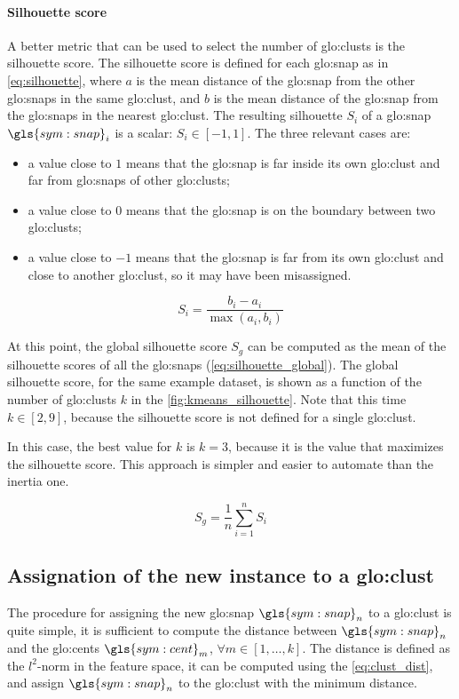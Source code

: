 \paragraph*{Silhouette score}
A better metric that can be used to select the number of \gls{glo:clust}s is the silhouette score.
The silhouette score is defined for each {\gls{glo:snap}} as in \autoref{eq:silhouette}, where $a$ is the mean distance of the {\gls{glo:snap}} from the other {\gls{glo:snap}}s in the same \gls{glo:clust}, and $b$ is the mean distance of the {\gls{glo:snap}} from the {\gls{glo:snap}}s in the nearest \gls{glo:clust}. The resulting silhouette $S_i$ of a {\gls{glo:snap}} $\gls{sym:snap}_i$ is a scalar: $S_i \in [-1,1]$.
The three relevant cases are:
\begin{itemize}
  \item a value close to $1$ means that the {\gls{glo:snap}} is far inside its own \gls{glo:clust} and far from {\gls{glo:snap}}s of other \gls{glo:clust}s;
  \item a value close to $0$ means that the {\gls{glo:snap}} is on the boundary between two \gls{glo:clust}s;
  \item a value close to $-1$ means that the {\gls{glo:snap}} is far from its own \gls{glo:clust} and close to another \gls{glo:clust}, so it may have been misassigned.
\end{itemize}

\begin{equation}
  \label{eq:silhouette}
  S_i = \frac{b_i - a_i}{\max{(a_i,b_i)}}
\end{equation}

At this point, the global silhouette score $S_g$ can be computed as the mean of the silhouette scores of all the {\gls{glo:snap}}s (\autoref{eq:silhouette_global}). The global silhouette score, for the same example dataset, is shown as a function of the number of \gls{glo:clust}s $k$ in the \autoref{fig:kmeans_silhouette}. Note that this time $k \in [2,9]$, because the silhouette score is not defined for a single \gls{glo:clust}.

In this case, the best value for $k$ is $k=3$, because it is the value that maximizes the silhouette score. This approach is simpler and easier to automate than the inertia one. 

\begin{equation}
  \label{eq:silhouette_global}
  S_g = \frac{1}{n}\sum_{i=1}^{n} S_i
\end{equation}

\subsection{Assignation of the new instance to a \gls{glo:clust}}
The procedure for assigning the new {\gls{glo:snap}} $\gls{sym:snap}_n$ to a \gls{glo:clust} is quite simple, it is sufficient to compute the distance between $\gls{sym:snap}_n$ and the {\gls{glo:cent}}s $\gls{sym:cent}_m$, $\forall m \in  [1, \dots , k]$. The distance is defined as the $l^2$-norm in the feature space, it can be computed using the \autoref{eq:clust_dist}, and assign $\gls{sym:snap}_n$ to the \gls{glo:clust} with the minimum distance.

